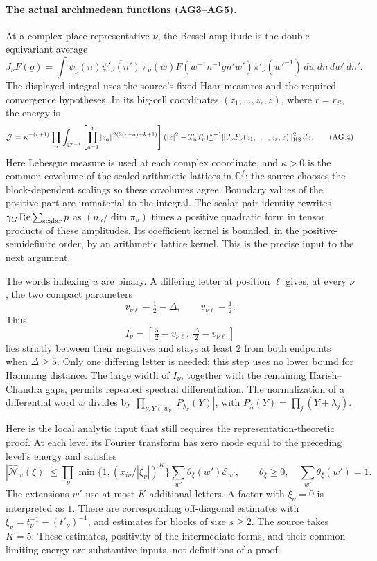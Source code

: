 \documentclass[11pt,a4paper]{article}
\numberwithin{equation}{section}
\theoremstyle{remark}\newtheorem{remark}[theorem]{Remark}
\begin{document}
\paragraph{The actual archimedean functions (AG3--AG5).}
At a complex-place representative \(\nu\), the Bessel amplitude is
the double equivariant average
\[
 J_\nu F(g)=
 \int \psi_\nu(n)\overline{\psi'_\nu(n')}\,
 \pi_\nu(w)F(w^{-1}n^{-1}gn'w')\pi'_\nu(w'^{-1})
 \,dw\,dn\,dw'\,dn'.
                                                               \tag{AG.3}
\]
The displayed integral uses the source's fixed Haar measures
and the required convergence hypotheses.  In its big-cell coordinates
\((z_1,\ldots,z_r,z)\), where \(r=r_S\), the energy is
\[
 \mathcal J=\kappa^{-(r+1)}
 \prod_\nu\int_{\mathbb C^{r+1}}
 \left[\prod_{a=1}^{r}|z_a|^{\,2(2(r-a)+k+1)}\right]
 (|z|^2-T_uT_v)_+^{\,k-1}
 \|J_\nu F_\nu(z_1,\ldots,z_r,z)\|_{\rm HS}^2\,dz .
                                                               \tag{AG.4}
\]
Here Lebesgue measure is used at each complex coordinate, and
\(\kappa>0\) is the common covolume of the scaled arithmetic
lattices in \(\mathbb C^f\); the source chooses the block-dependent
scalings so these covolumes agree.  Boundary values of the
positive part are immaterial to the integral.  The scalar pair identity rewrites
\(\gamma_G\operatorname{Re}\sum_{\rm scalar}p\) as
\((n_u/\dim\pi_u)\) times a positive quadratic form in tensor
products of these amplitudes.  Its coefficient kernel is bounded,
in the positive-semidefinite order, by an arithmetic lattice
kernel.  This is the precise input to the next argument.

The words indexing \(u\) are binary.  A differing letter at position
\(\ell\) gives, at every \(\nu\), the two compact parameters
\[
 v_{\nu\ell}-\tfrac12-\Delta,\qquad v_{\nu\ell}-\tfrac12 .
\]
Thus
\[
 I_\nu=[\,\tfrac52-v_{\nu\ell},\ \tfrac{\Delta}{2}-v_{\nu\ell}\,]
                                                               \tag{AG.5}
\]
lies strictly between their negatives and stays at least \(2\)
from both endpoints when \(\Delta\ge5\).  Only one differing
letter is needed; this step uses no lower bound for Hamming distance.
The large width of \(I_\nu\), together with the remaining
Harish--Chandra gaps, permits repeated spectral differentiation.
The normalization of a differential word \(w\) divides by
\(\prod_{\nu,Y\in w_\nu}|P_{\lambda_\nu}(Y)|\), with
\(P_\lambda(Y)=\prod_j(Y+\lambda_j)\).

Here is the local analytic input that still requires the
representation-theoretic proof.  At each level its Fourier transform
has zero mode equal to the preceding level's energy and satisfies
\[
 |\widehat{\mathcal N}_w(\xi)|
 \le\prod_\nu\min\{1,(x_{i\nu}/|\xi_\nu|)^K\}
             \sum_{w'}\theta_\xi(w')\mathcal E_{w'},\qquad
 \theta_\xi\ge0,\quad\sum_{w'}\theta_\xi(w')=1.                 \tag{AG.6}
\]
The extensions \(w'\) use at most \(K\) additional letters.
A factor with \(\xi_\nu=0\) is interpreted as \(1\).
There are corresponding off-diagonal estimates with
\(\xi_\nu=t_\nu^{-1}-(t'_\nu)^{-1}\), and estimates for blocks of
size \(s\ge2\).  The source takes \(K=5\).  These estimates,
positivity of the intermediate forms, and their common limiting
energy are substantive inputs, not definitions of a proof.
\end{document}
